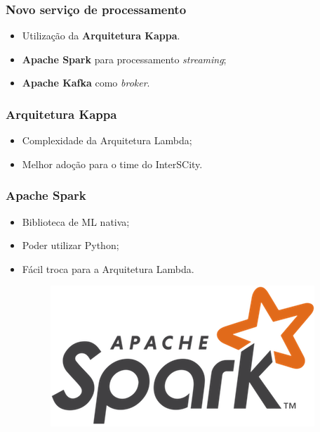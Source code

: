 \documentclass{beamer}
\begin{document}
  \begin{frame}
      \frametitle{Novo serviço de processamento}
      \begin{itemize}
          \item<2-> Utilização da \textbf{Arquitetura Kappa}.
          \item<3-> \textbf{Apache Spark} para processamento \textit{streaming};
          \item<4-> \textbf{Apache Kafka} como \textit{broker}.
      \end{itemize}
  \end{frame}

  \begin{frame}
      \frametitle{Arquitetura Kappa}
      \begin{itemize}
          \item Complexidade da Arquitetura Lambda;
          \item Melhor adoção para o time do InterSCity.
      \end{itemize}
  \end{frame}

  \begin{frame}
      \frametitle{Apache Spark}
      \begin{itemize}
          \item Biblioteca de ML nativa;
          \item Poder utilizar Python;
          \item Fácil troca para a Arquitetura Lambda.
              \begin{figure}
                  \includegraphics[scale=0.3]{figures/spark_logo.png}
              \end{figure}
      \end{itemize}
  \end{frame}
\end{document}
